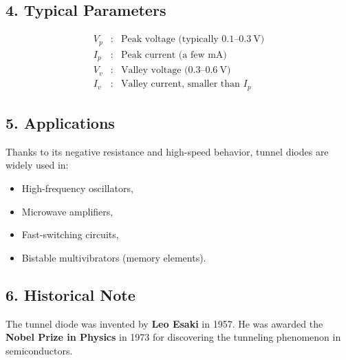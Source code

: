\documentclass{article}
\begin{document}
\subsection*{4. Typical Parameters}

\[
\begin{array}{lcl}
V_p & : & \text{Peak voltage (typically } 0.1\text{--}0.3~\text{V)} \\
I_p & : & \text{Peak current (a few mA)} \\
V_v & : & \text{Valley voltage (}0.3\text{--}0.6~\text{V)} \\
I_v & : & \text{Valley current, smaller than } I_p
\end{array}
\]

\subsection*{5. Applications}

Thanks to its negative resistance and high-speed behavior, tunnel diodes are widely used in:
\begin{itemize}
    \item High-frequency oscillators,
    \item Microwave amplifiers,
    \item Fast-switching circuits,
    \item Bistable multivibrators (memory elements).
\end{itemize}

\subsection*{6. Historical Note}

The tunnel diode was invented by \textbf{Leo Esaki} in 1957.  
He was awarded the \textbf{Nobel Prize in Physics} in 1973 for discovering the tunneling phenomenon in semiconductors.
\end{document}
